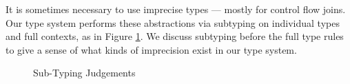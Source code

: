 It is sometimes necessary to use imprecise types --- mostly for control flow joins.  Our type system performs these abstractions via subtyping on individual types and full contexts, as in Figure \ref{fig:sub-typing}.  We discuss subtyping before the full type rules to give a sense of what kinds of imprecision exist in our type system.
\begin{figure}[!t]\scriptsize
{}
\vspace{-2em}
\caption{Sub-Typing Judgements}
\label{fig:sub-typing}
\end{figure}

